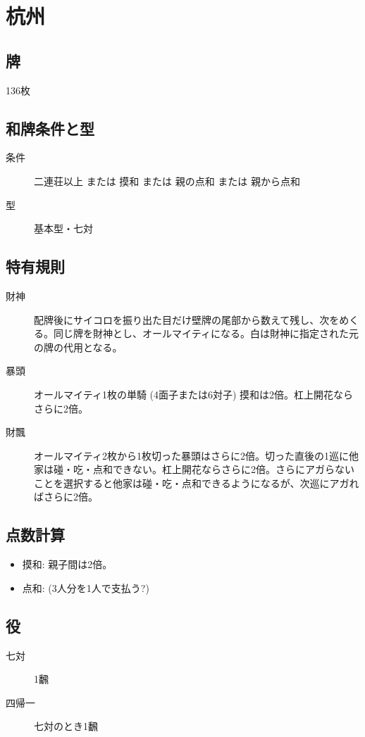 \documentclass{ltjsarticle}
\begin{document}
\section{杭州}
\subsection{牌}136枚
\subsection{和牌条件と型}
\begin{description}
    \item[条件] 二連荘以上 または 摸和 または 親の点和 または 親から点和
    \item[型] 基本型・七対
\end{description}
\subsection{特有規則}
\begin{description}
    \item[財神] 配牌後にサイコロを振り出た目だけ壁牌の尾部から数えて残し、次をめくる。同じ牌を財神とし、オールマイティになる。白は財神に指定された元の牌の代用となる。
    \item[暴頭] オールマイティ1枚の単騎 (4面子または6対子) 摸和は2倍。杠上開花ならさらに2倍。
    \item[財飄] オールマイティ2枚から1枚切った暴頭はさらに2倍。切った直後の1巡に他家は碰・吃・点和できない。杠上開花ならさらに2倍。さらにアガらないことを選択すると他家は碰・吃・点和できるようになるが、次巡にアガればさらに2倍。
\end{description}
\subsection{点数計算}
\begin{itemize}
    \item 摸和: 親子間は2倍。
    \item 点和: (3人分を1人で支払う?)
\end{itemize}
\subsection{役}
\begin{description}
    \item[七対] 1飜
    \item[四帰一] 七対のとき1飜
    \item[]
\end{description}
\end{document}
